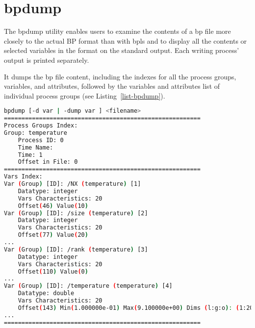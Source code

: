 \section{bpdump}

The bpdump utility enables users to examine the contents of a bp file more closely 
to the actual BP format than with bpls and to display all the contents or selected 
variables in the format on the standard output. Each writing process' output is 
printed separately. 

It dumps the bp file content, including the indexes for all the process groups, 
variables, and attributes, followed by the variables and attributes list of individual 
process groups (see Listing~\ref{list-bpdump}).

\begin{lstlisting}[language=bash,caption={bpdump utility},label={list-bpdump}]
bpdump [-d var | -dump var ] <filename>
======================================================== 
Process Groups Index:
Group: temperature
	Process ID: 0 
	Time Name:
	Time: 1 
	Offset in File: 0
========================================================
Vars Index:
Var (Group) [ID]: /NX (temperature) [1]
	Datatype: integer
	Vars Characteristics: 20
	Offset(46) Value(10)
Var (Group) [ID]: /size (temperature) [2] 
	Datatype: integer
	Vars Characteristics: 20 
	Offset(77) Value(20)
...
Var (Group) [ID]: /rank (temperature) [3] 
	Datatype: integer
	Vars Characteristics: 20 
	Offset(110) Value(0)
...
Var (Group) [ID]: /temperature (temperature) [4] 
	Datatype: double
	Vars Characteristics: 20
	Offset(143) Min(1.000000e-01) Max(9.100000e+00) Dims (l:g:o): (1:20:0,10:10:0)
...
========================================================
\end{lstlisting}

